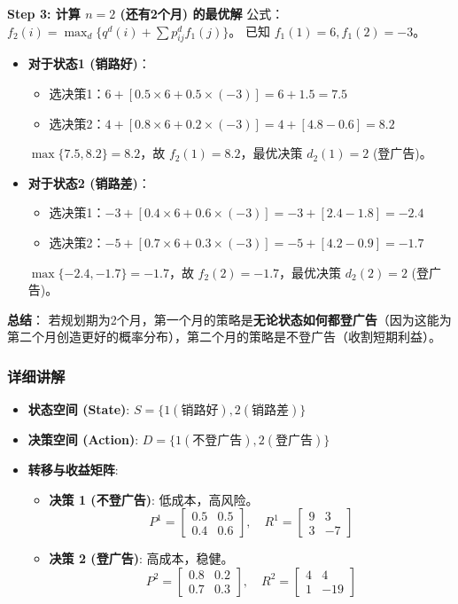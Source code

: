\documentclass[a4paper,12pt]{ctexart} %
\begin{document}
	\textbf{Step 3: 计算 $n=2$ (还有2个月) 的最优解}
	公式：$f_2(i) = \max_d \{ q^d(i) + \sum p_{ij}^d f_1(j) \}$。
	已知 $f_1(1)=6, f_1(2)=-3$。
	
	\begin{itemize}
		\item \textbf{对于状态1 (销路好)}：
		\begin{itemize}
			\item 选决策1：$6 + [0.5 \times 6 + 0.5 \times (-3)] = 6 + 1.5 = 7.5$
			\item 选决策2：$4 + [0.8 \times 6 + 0.2 \times (-3)] = 4 + [4.8 - 0.6] = 8.2$
		\end{itemize}
		$\max\{7.5, 8.2\} = 8.2$，故 $f_2(1)=8.2$，最优决策 $d_2(1)=2$ (登广告)。
		
		\item \textbf{对于状态2 (销路差)}：
		\begin{itemize}
			\item 选决策1：$-3 + [0.4 \times 6 + 0.6 \times (-3)] = -3 + [2.4 - 1.8] = -2.4$
			\item 选决策2：$-5 + [0.7 \times 6 + 0.3 \times (-3)] = -5 + [4.2 - 0.9] = -1.7$
		\end{itemize}
		$\max\{-2.4, -1.7\} = -1.7$，故 $f_2(2)=-1.7$，最优决策 $d_2(2)=2$ (登广告)。
	\end{itemize}
	
	\textbf{总结}：
	若规划期为2个月，第一个月的策略是\textbf{无论状态如何都登广告}（因为这能为第二个月创造更好的概率分布），第二个月的策略是不登广告（收割短期利益）。
	
	\subsubsection{详细讲解}
	\begin{itemize}
		\item \textbf{状态空间 (State)}: $S = \{1 (\text{销路好}), 2 (\text{销路差})\}$
		\item \textbf{决策空间 (Action)}: $D = \{1 (\text{不登广告}), 2 (\text{登广告})\}$
		\item \textbf{转移与收益矩阵}:
		\begin{itemize}
			\item \textbf{决策 1 (不登广告)}: 低成本，高风险。
			\[
			P^1 = \begin{bmatrix} 0.5 & 0.5 \\ 0.4 & 0.6 \end{bmatrix}, \quad
			R^1 = \begin{bmatrix} 9 & 3 \\ 3 & -7 \end{bmatrix}
			\]
			\item \textbf{决策 2 (登广告)}: 高成本，稳健。
			\[
			P^2 = \begin{bmatrix} 0.8 & 0.2 \\ 0.7 & 0.3 \end{bmatrix}, \quad
			R^2 = \begin{bmatrix} 4 & 4 \\ 1 & -19 \end{bmatrix}
			\]
		\end{itemize}
	\end{itemize}
	
\end{document}
